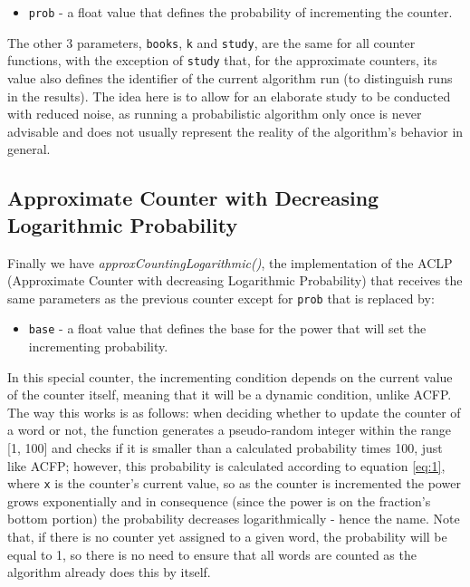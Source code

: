 \documentclass[shortpaper]{revdetua}
\begin{document}
\begin{itemize}
    \item \texttt{prob} - a float value that defines the probability of incrementing the counter.
\end{itemize}

The other 3 parameters, \texttt{books}, \texttt{k} and \texttt{study}, are 
the same for all counter functions, with the exception of \texttt{study} that,
for the approximate counters, its value also defines the identifier of the 
current algorithm run (to distinguish runs in the results).
The idea here is to allow for an elaborate study to be conducted with reduced 
noise, as running a probabilistic algorithm only once is never advisable and does
not usually represent the reality of the algorithm's behavior in general.

\subsection{Approximate Counter \newline with Decreasing Logarithmic Probability}

Finally we have \textit{approxCountingLogarithmic()}, the implementation of the 
ACLP (Approximate Counter with decreasing Logarithmic Probability) that receives
the same parameters as the previous counter except for \texttt{prob} that is 
replaced by:

\begin{itemize}
    \item \texttt{base} - a float value that defines the base for the power that will set the incrementing probability.
\end{itemize}

In this special counter, the incrementing condition depends on the current value 
of the counter itself, meaning that it will be a dynamic condition, unlike ACFP.
The way this works is as follows: when deciding whether to update the counter 
of a word or not, the function generates a pseudo-random integer within the 
range [1, 100] and checks if it is smaller than a calculated probability times 100,
just like ACFP; however, this probability is calculated according to equation \ref{eq:1},
where \texttt{x} is the counter's current value, so as the counter is incremented 
the power grows exponentially and in consequence (since the power is on the 
fraction's bottom portion) the probability decreases logarithmically - hence
the name.
Note that, if there is no counter yet assigned to a given word, the probability 
will be equal to 1, so there is no need to ensure that all words are counted as 
the algorithm already does this by itself.
\end{document}
